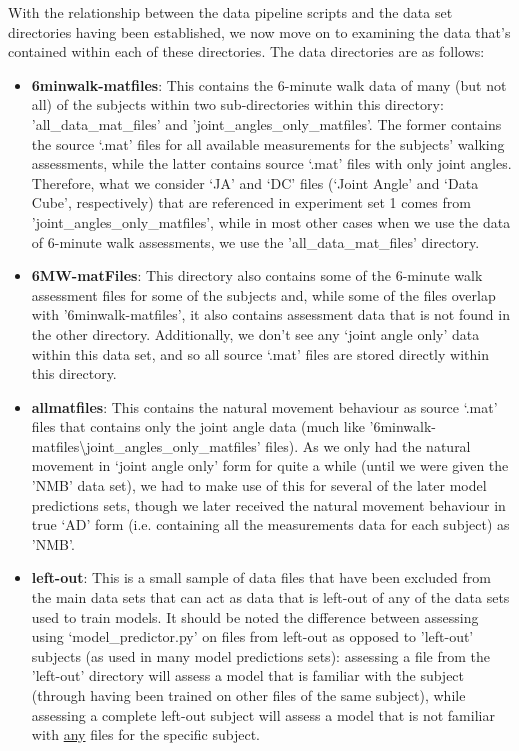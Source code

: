 \documentclass[12pt,twoside]{report}
\begin{document}
\quad With the relationship between the data pipeline scripts and the data set directories having been established, we now move on to examining the data that’s contained within each of these directories. The data directories are as follows:

\begin{itemize}
	\item \textbf{6minwalk-matfiles}: This contains the 6-minute walk data of many (but not all) of the subjects within two sub-directories within this directory: 'all\_data\_mat\_files' and 'joint\_angles\_only\_matfiles'. The former contains the source ‘.mat’ files for all available measurements for the subjects’ walking assessments, while the latter contains source ‘.mat’ files with only joint angles. Therefore, what we consider ‘JA’ and ‘DC’ files (‘Joint Angle’ and ‘Data Cube’, respectively) that are referenced in experiment set 1 comes from 'joint\_angles\_only\_matfiles', while in most other cases when we use the data of 6-minute walk assessments, we use the 'all\_data\_mat\_files' directory.
	\item \textbf{6MW-matFiles}: This directory also contains some of the 6-minute walk assessment files for some of the subjects and, while some of the files overlap with '6minwalk-matfiles', it also contains assessment data that is not found in the other directory. Additionally, we don’t see any ‘joint angle only’ data within this data set, and so all source ‘.mat’ files are stored directly within this directory.
	\item \textbf{allmatfiles}: This contains the natural movement behaviour as source ‘.mat’ files that contains only the joint angle data (much like '6minwalk-matfiles\textbackslash joint\_angles\_only\_matfiles' files). As we only had the natural movement in ‘joint angle only’ form for quite a while (until we were given the 'NMB' data set), we had to make use of this for several of the later model predictions sets, though we later received the natural movement behaviour in true ‘AD’ form (i.e. containing all the measurements data for each subject) as 'NMB'.
	\item \textbf{left-out}: This is a small sample of data files that have been excluded from the main data sets that can act as data that is left-out of any of the data sets used to train models. It should be noted the difference between assessing using ‘model\_predictor.py’ on files from left-out as opposed to 'left-out' subjects (as used in many model predictions sets): assessing a file from the 'left-out' directory will assess a model that is familiar with the subject (through having been trained on other files of the same subject), while assessing a complete left-out subject will assess a model that is not familiar with \underline{any} files for the specific subject.

\end{itemize}
\end{document}
